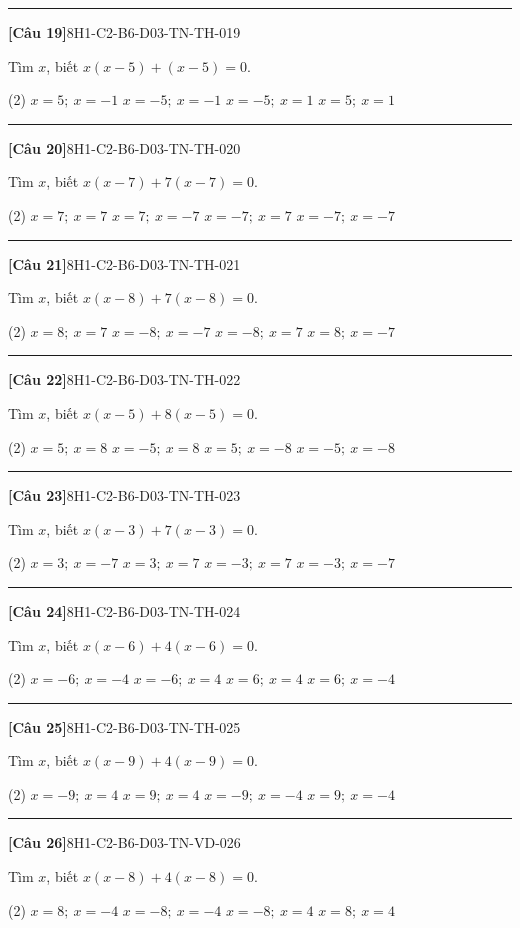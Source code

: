 \documentclass[12pt,a4paper]{article}
\newif\ifloigiai
\newenvironment{cauhoi}[2]{%
  \par\medskip\noindent\rule{\textwidth}{0.4pt}\par\nopagebreak
  \noindent\textbf{[#1]}\hfill{\scriptsize\ttfamily #2}\par\nopagebreak\smallskip}{\par}
\newcommand{\dapan}[1]{\ifloigiai\par\smallskip\noindent\textit{Đáp án:} \textbf{#1}\par\fi}
\begin{document}
\begin{cauhoi}{Câu 19}{8H1-C2-B6-D03-TN-TH-019}
Tìm $x$, biết $x(x-5)+(x-5)=0$.
\begin{tasks}(2)
\task $x=5;\ x=-1$
\task $x=-5;\ x=-1$
\task $x=-5;\ x=1$
\task $x=5;\ x=1$
\end{tasks}
\dapan{A}
\end{cauhoi}
\begin{cauhoi}{Câu 20}{8H1-C2-B6-D03-TN-TH-020}
Tìm $x$, biết $x(x-7)+7(x-7)=0$.
\begin{tasks}(2)
\task $x=7;\ x=7$
\task $x=7;\ x=-7$
\task $x=-7;\ x=7$
\task $x=-7;\ x=-7$
\end{tasks}
\dapan{B}
\end{cauhoi}
\begin{cauhoi}{Câu 21}{8H1-C2-B6-D03-TN-TH-021}
Tìm $x$, biết $x(x-8)+7(x-8)=0$.
\begin{tasks}(2)
\task $x=8;\ x=7$
\task $x=-8;\ x=-7$
\task $x=-8;\ x=7$
\task $x=8;\ x=-7$
\end{tasks}
\dapan{D}
\end{cauhoi}
\begin{cauhoi}{Câu 22}{8H1-C2-B6-D03-TN-TH-022}
Tìm $x$, biết $x(x-5)+8(x-5)=0$.
\begin{tasks}(2)
\task $x=5;\ x=8$
\task $x=-5;\ x=8$
\task $x=5;\ x=-8$
\task $x=-5;\ x=-8$
\end{tasks}
\dapan{C}
\end{cauhoi}
\begin{cauhoi}{Câu 23}{8H1-C2-B6-D03-TN-TH-023}
Tìm $x$, biết $x(x-3)+7(x-3)=0$.
\begin{tasks}(2)
\task $x=3;\ x=-7$
\task $x=3;\ x=7$
\task $x=-3;\ x=7$
\task $x=-3;\ x=-7$
\end{tasks}
\dapan{A}
\end{cauhoi}
\begin{cauhoi}{Câu 24}{8H1-C2-B6-D03-TN-TH-024}
Tìm $x$, biết $x(x-6)+4(x-6)=0$.
\begin{tasks}(2)
\task $x=-6;\ x=-4$
\task $x=-6;\ x=4$
\task $x=6;\ x=4$
\task $x=6;\ x=-4$
\end{tasks}
\dapan{D}
\end{cauhoi}
\begin{cauhoi}{Câu 25}{8H1-C2-B6-D03-TN-TH-025}
Tìm $x$, biết $x(x-9)+4(x-9)=0$.
\begin{tasks}(2)
\task $x=-9;\ x=4$
\task $x=9;\ x=4$
\task $x=-9;\ x=-4$
\task $x=9;\ x=-4$
\end{tasks}
\dapan{D}
\end{cauhoi}
\begin{cauhoi}{Câu 26}{8H1-C2-B6-D03-TN-VD-026}
Tìm $x$, biết $x(x-8)+4(x-8)=0$.
\begin{tasks}(2)
\task $x=8;\ x=-4$
\task $x=-8;\ x=-4$
\task $x=-8;\ x=4$
\task $x=8;\ x=4$
\end{tasks}
\dapan{A}
\end{cauhoi}
\end{document}
